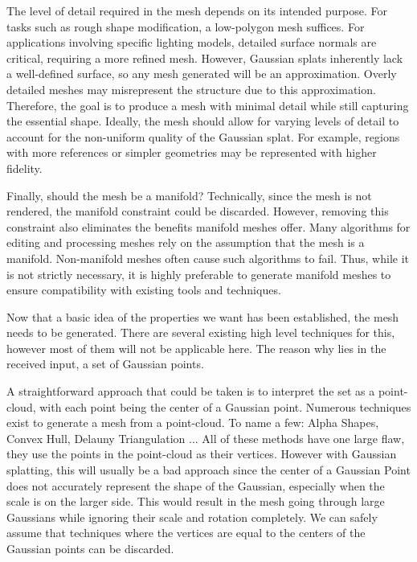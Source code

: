 The level of detail required in the mesh depends on its intended purpose. For tasks such as rough shape modification, a low-polygon mesh suffices.
For applications involving specific lighting models, detailed surface normals are critical, requiring a more refined mesh. However, Gaussian splats inherently lack a well-defined surface, so any mesh generated will be an approximation. Overly detailed meshes may misrepresent the structure due to this approximation. Therefore, the goal is to produce a mesh with minimal detail while still capturing the essential shape. Ideally, the mesh should allow for varying levels of detail to account for the non-uniform quality of the Gaussian splat. For example, regions with more references or simpler geometries may be represented with higher fidelity.

Finally, should the mesh be a manifold?
Technically, since the mesh is not rendered, the manifold constraint could be discarded. However, removing this constraint also eliminates the benefits manifold meshes offer. Many algorithms for editing and processing meshes rely on the assumption that the mesh is a manifold. Non-manifold meshes often cause such algorithms to fail. Thus, while it is not strictly necessary, it is highly preferable to generate manifold meshes to ensure compatibility with existing tools and techniques.

Now that a basic idea of the properties we want has been established, the mesh needs to be generated. There are several existing high level techniques for this, however most of them will not be applicable here. The reason why lies in the received input, a set of Gaussian points.

A straightforward approach that could be taken is to interpret the set as a point-cloud, with each point being the center of a Gaussian point. Numerous techniques exist to generate a mesh from a point-cloud. To name a few: Alpha Shapes, Convex Hull, Delauny Triangulation ... All of these methods have one large flaw, they use the points in the point-cloud as their vertices. However with Gaussian splatting, this will usually be a bad approach since the center of a Gaussian Point does not accurately represent the shape of the Gaussian, especially when the scale is on the larger side. This would result in the mesh going through large Gaussians while ignoring their scale and rotation completely. We can safely assume that techniques where the vertices are equal to the centers of the Gaussian points can be discarded.

